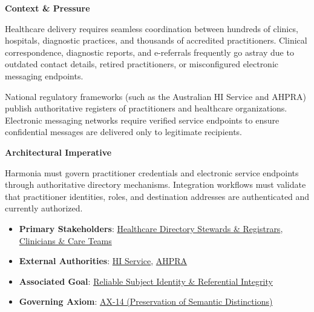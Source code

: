 \par\medskip\textbf{Context \& Pressure}\par


Healthcare delivery requires seamless coordination between hundreds of clinics, hospitals, diagnostic practices, and thousands of accredited practitioners. Clinical correspondence, diagnostic reports, and e-referrals frequently go astray due to outdated contact details, retired practitioners, or misconfigured electronic messaging endpoints.



National regulatory frameworks (such as the Australian HI Service and AHPRA) publish authoritative registers of practitioners and healthcare organizations. Electronic messaging networks require verified service endpoints to ensure confidential messages are delivered only to legitimate recipients.



\par\medskip\textbf{Architectural Imperative}\par


Harmonia must govern practitioner credentials and electronic service endpoints through authoritative directory mechanisms. Integration workflows must validate that practitioner identities, roles, and destination addresses are authenticated and currently authorized.



\begin{itemize}


\item \textbf{Primary Stakeholders}: \href{\detokenize{../../../../../docs/markdown/01-motivation/stakeholders/enterprise-stakeholders.md}}{Healthcare Directory Stewards \& Registrars}, \href{\detokenize{../../../../../docs/markdown/01-motivation/stakeholders/enterprise-stakeholders.md}}{Clinicians \& Care Teams}

\item \textbf{External Authorities}: \href{\detokenize{../../../../../docs/markdown/01-motivation/stakeholders/external-authorities.md}}{HI Service}, \href{\detokenize{../../../../../docs/markdown/01-motivation/stakeholders/external-authorities.md}}{AHPRA}

\item \textbf{Associated Goal}: \href{\detokenize{../../../../../docs/markdown/01-motivation/goals-outcomes/strategic-goals.md}}{Reliable Subject Identity \& Referential Integrity}

\item \textbf{Governing Axiom}: \hyperref[element:d3fc6025dc7646d1b2020b51f7a44bfa]{AX-14 (Preservation of Semantic Distinctions)}

\end{itemize}

